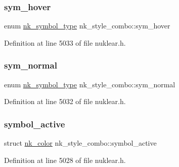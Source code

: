\subsubsection{\texorpdfstring{sym\+\_\+hover}{sym\_hover}}
{\footnotesize\ttfamily enum \mbox{\hyperlink{nuklear_8h_a29b4aaa400d0ce28aea3c8c9c372ac07}{nk\+\_\+symbol\+\_\+type}} nk\+\_\+style\+\_\+combo\+::sym\+\_\+hover}



Definition at line 5033 of file nuklear.\+h.

\mbox{\label{structnk__style__combo_ab9bddd4bf005fe764cfc0e31760aa75a}} 
\subsubsection{\texorpdfstring{sym\+\_\+normal}{sym\_normal}}
{\footnotesize\ttfamily enum \mbox{\hyperlink{nuklear_8h_a29b4aaa400d0ce28aea3c8c9c372ac07}{nk\+\_\+symbol\+\_\+type}} nk\+\_\+style\+\_\+combo\+::sym\+\_\+normal}



Definition at line 5032 of file nuklear.\+h.

\mbox{\label{structnk__style__combo_a9b73b9d12d5dbefafee3d6e2ca8a534e}} 
\subsubsection{\texorpdfstring{symbol\+\_\+active}{symbol\_active}}
{\footnotesize\ttfamily struct \mbox{\hyperlink{structnk__color}{nk\+\_\+color}} nk\+\_\+style\+\_\+combo\+::symbol\+\_\+active}



Definition at line 5028 of file nuklear.\+h.

\mbox{\label{structnk__style__combo_aec3460dac9cc591cc9a8da26f01d941f}} 
